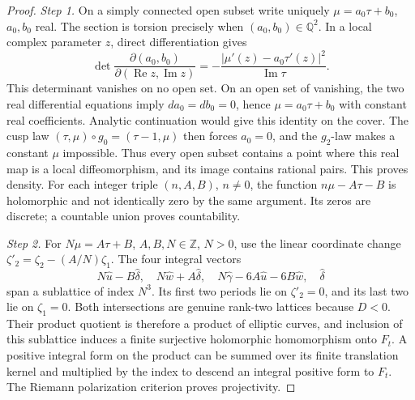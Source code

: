 \begin{proof}
\par\noindent\textit{Step 1.} On a simply connected open subset write uniquely
\(\mu=a_0\tau+b_0\), \(a_0,b_0\) real. The section is torsion precisely
when \((a_0,b_0)\in\mathbb Q^2\). In a local complex parameter \(z\), direct
differentiation gives
\[
 \det\frac{\partial(a_0,b_0)}{\partial(\operatorname{Re}z,
 \operatorname{Im}z)}
 =-\frac{|\mu'(z)-a_0\tau'(z)|^2}{\operatorname{Im}\tau}.
\]
This determinant vanishes on no open set. On an open set of vanishing,
the two real differential equations imply \(da_0=db_0=0\), hence
\(\mu=a_0\tau+b_0\) with constant real coefficients. Analytic continuation
would give this identity on the cover. The cusp law
\((\tau,\mu)\circ g_0=(\tau-1,\mu)\) then forces \(a_0=0\), and the
\(g_2\)-law makes a constant \(\mu\) impossible. Thus every open subset
contains a point where this real map is a local diffeomorphism, and its
image contains rational pairs. This proves density. For each integer
triple \((n,A,B)\), \(n\ne0\), the function \(n\mu-A\tau-B\) is
holomorphic and not identically zero by the same argument. Its zeros are
discrete; a countable union proves countability.

\par\noindent\textit{Step 2.} For \(N\mu=A\tau+B\), \(A,B,N\in\mathbb Z\), \(N>0\), use the linear
coordinate change \(\zeta'_2=\zeta_2-(A/N)\zeta_1\).
The four integral vectors
\[
 N\widehat u-B\widehat\delta,\quad
 N\widehat w+A\widehat\delta,\quad
 N\widehat\gamma-6A\widehat u-6B\widehat w,\quad
 \widehat\delta
\]
span a sublattice of index \(N^3\). Its first two periods lie on
\(\zeta'_2=0\), and its last two lie on \(\zeta_1=0\).
Both intersections are genuine rank-two lattices because \(D<0\).
Their product quotient is therefore a product of elliptic curves, and
inclusion of this sublattice induces a finite surjective holomorphic
homomorphism onto \(F_t\). A positive integral form on the product can
be summed over its finite translation kernel and multiplied by the
index to descend an integral positive form to \(F_t\). The Riemann
polarization criterion proves projectivity.


\end{proof}
